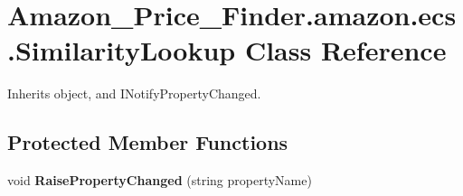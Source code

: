 \hypertarget{class_amazon___price___finder_1_1amazon_1_1ecs_1_1_similarity_lookup}{\section{Amazon\-\_\-\-Price\-\_\-\-Finder.\-amazon.\-ecs.\-Similarity\-Lookup Class Reference}
\label{class_amazon___price___finder_1_1amazon_1_1ecs_1_1_similarity_lookup}
}


 




Inherits object, and I\-Notify\-Property\-Changed.

\subsection*{Protected Member Functions}
\begin{DoxyCompactItemize}
\item 
\hypertarget{class_amazon___price___finder_1_1amazon_1_1ecs_1_1_similarity_lookup_aaeb3b1b6fa772e39588b389920674e0d}{void {\bfseries Raise\-Property\-Changed} (string property\-Name)}\label{class_amazon___price___finder_1_1amazon_1_1ecs_1_1_similarity_lookup_aaeb3b1b6fa772e39588b389920674e0d}

\end{DoxyCompactItemize}
